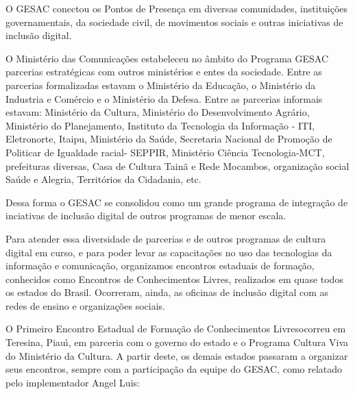 \documentclass[
12pt,		%
openright,	%
twoside,  %
a4paper,			%
chapter=TITLE,		%
english,			%
french,				%
spanish,			%
brazil				%
]{USPSC-classe/USPSC}
\begin{document}
O GESAC conectou os Pontos de Presen\c{c}a em diversas comunidades, institui\c{c}\~oes governamentais, da sociedade civil, de movimentos sociais e outras iniciativas de inclus\~ao digital.










O Minist\'erio das Comunica\c{c}\~oes estabeleceu no \^ambito do Programa GESAC parcerias estrat\'egicas com outros minist\'erios e entes da sociedade. Entre as parcerias formalizadas estavam o Minist\'erio da Educa\c{c}\~ao, o Minist\'erio da Industria e Com\'ercio e o Minist\'erio da Defesa. Entre as parcerias informais estavam: Minist\'erio da Cultura, Minist\'erio do Desenvolvimento Agr\'ario, Minist\'erio do Planejamento, Instituto da Tecnologia da Informa\c{c}\~ao - ITI, Eletronorte, Itaipu, Minist\'erio da Sa\'ude, Secretaria Nacional de Promo\c{c}\~ao de Politicar de Igualdade racial- SEPPIR, Minist\'erio Ci\^encia Tecnologia-MCT, prefeituras diversas, Casa de Cultura Tain\~a e Rede Mocambos, organiza\c{c}\~ao social \textquotedbl Sa\'ude e Alegria\textquotedbl , Territ\'orios da Cidadania, etc.










Dessa forma o GESAC se consolidou como um grande programa de integra\c{c}\~ao de inciativas de inclus\~ao digital de outros programas de menor escala.










Para atender essa diversidade de parcerias e de outros programas de cultura digital em curso, e para poder levar as capacita\c{c}\~oes no uso das tecnologias da informa\c{c}\~ao e comunica\c{c}\~ao, organizamos encontros estaduais de forma\c{c}\~ao, conhecidos como \textquotedbl Encontros de Conhecimentos Livres\textquotedbl , realizados em  quase todos os estados do Brasil. Ocorreram, ainda, as  oficinas de inclus\~ao digital com as redes de ensino e organiza\c{c}\~oes sociais.










O \textquotedbl Primeiro Encontro Estadual de Forma\c{c}\~ao de Conhecimentos Livres\textquotedbl  ocorreu em  Teresina, Piau\'{\i}, em parceria com o governo do estado e o Programa Cultura Viva do Minist\'erio da Cultura. A partir deste, os demais estados passaram a organizar seus encontros, sempre com a participa\c{c}\~ao da equipe do GESAC, como relatado pelo implementador Angel Luis:
\end{document}
